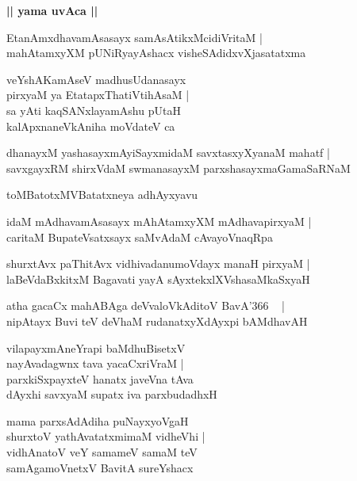 \documentclass[twoside,12pt,openright]{book}
\newcounter{shloka}[chapter]
\def\uvaca#1{\centerline{{\large\textbf{#1}}}}
\begin{document}
\uvaca{|| yama uvAca ||}

\begin{shloka}%
EtanAmxdhavamAsasayx samAsAtikxMcidiVritaM |\\
mahAtamxyXM pUNiRyayAshacx visheSAdidxvXjasatatxma
\end{shloka}

\begin{shloka}%
veYshAKamAseV madhusUdanasayx \\
pirxyaM ya EtatapxThatiVtihAsaM |\\
sa yAti kaqSANxlayamAshu pUtaH \\
kalApxnaneVkAniha moVdateV ca 
\end{shloka}

\begin{shloka}%
dhanayxM yashasayxmAyiSayxmidaM savxtasxyXyanaM mahatf |\\
savxgayxRM shirxVdaM swmanasayxM parxshasayxmaGamaSaRNaM 
\end{shloka}

\begin{center}
toMBatotxMVBatatxneya adhAyxyavu
\end{center}

\begin{shloka}%
idaM mAdhavamAsasayx mAhAtamxyXM mAdhavapirxyaM |\\
caritaM BupateVsatxsayx saMvAdaM cAvayoVnaqRpa 
\end{shloka}

\begin{shloka}%
shurxtAvx paThitAvx vidhivadanumoVdayx manaH pirxyaM |\\
laBeVdaBxkitxM Bagavati yayA sAyxtekxlXVshasaMkaSxyaH 
\end{shloka}

\begin{shloka}%
atha gacaCx mahABAga deVvaloVkAditoV BavA\char'366 ~ |\\
nipAtayx Buvi teV deVhaM rudanatxyXdAyxpi bAMdhavAH 
\end{shloka}

\begin{shloka}%
vilapayxmAneYrapi baMdhuBisetxV \\
nayAvadagwnx tava yacaCxriVraM |\\
parxkiSxpayxteV hanatx javeVna tAva \\
dAyxhi savxyaM supatx iva parxbudadhxH 
\end{shloka}

\begin{shloka}%
mama parxsAdAdiha puNayxyoVgaH \\
shurxtoV yathAvatatxmimaM vidheVhi |\\
vidhAnatoV veY samameV samaM teV \\
samAgamoVnetxV BavitA sureYshacx
\end{shloka}
\end{document}
